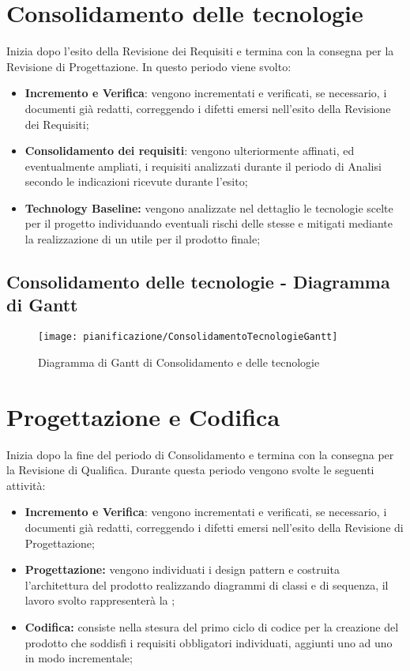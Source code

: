 \documentclass[../PianodiProgetto.tex]{subfiles}
\begin{document}
	\section{Consolidamento delle tecnologie} Inizia dopo l'esito della Revisione dei Requisiti e termina con la consegna per la Revisione di Progettazione. In questo periodo viene svolto:

	\begin{itemize}	
		\item \textbf{Incremento e Verifica}: vengono incrementati e verificati, se necessario, i documenti già redatti, correggendo i difetti emersi nell'esito della Revisione dei Requisiti;
		\item \textbf{Consolidamento dei requisiti}: vengono ulteriormente affinati, ed eventualmente ampliati, i requisiti analizzati durante il periodo di Analisi secondo le indicazioni ricevute durante l'esito;
		\item \textbf{Technology Baseline:} vengono analizzate nel dettaglio le tecnologie scelte per il progetto individuando eventuali rischi delle stesse e mitigati mediante la realizzazione di un  utile per il prodotto finale;
	\end{itemize}

	\subsection{Consolidamento delle tecnologie - Diagramma di Gantt}
	\begin{figure}[H]
		\texttt{[image: pianificazione/ConsolidamentoTecnologieGantt]}	
		\caption{Diagramma di Gantt di Consolidamento e delle tecnologie}\label{fig:3}
	\end{figure}
	\newpage
	\section{Progettazione e Codifica}
	Inizia dopo la fine del periodo di Consolidamento e termina con la consegna per la Revisione di Qualifica. Durante questa periodo vengono svolte le seguenti attività:
	\begin{itemize}
		\item \textbf{Incremento e Verifica}: vengono incrementati e verificati, se necessario, i documenti già redatti, correggendo i difetti emersi nell'esito della Revisione di Progettazione;	
		\item \textbf{Progettazione:} vengono individuati i design pattern e costruita l'architettura del prodotto realizzando diagrammi di classi e di sequenza, il lavoro svolto rappresenterà la ;
		\item \textbf{Codifica:} consiste nella stesura del primo ciclo di codice per la creazione del prodotto che soddisfi i requisiti obbligatori individuati, aggiunti uno ad uno in modo incrementale;
	\end{itemize}
\end{document}

